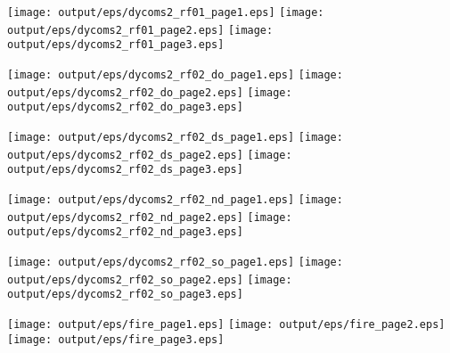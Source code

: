 \documentclass[11pt]{article}
\begin{document}
\begin{center}

\texttt{[image: output/eps/dycoms2\_rf01\_page1.eps]}
\texttt{[image: output/eps/dycoms2\_rf01\_page2.eps]}
\texttt{[image: output/eps/dycoms2\_rf01\_page3.eps]}
\end{center}
\newpage

\begin{center}

\texttt{[image: output/eps/dycoms2\_rf02\_do\_page1.eps]}
\texttt{[image: output/eps/dycoms2\_rf02\_do\_page2.eps]}
\texttt{[image: output/eps/dycoms2\_rf02\_do\_page3.eps]}
\end{center}
\newpage

\begin{center}

\texttt{[image: output/eps/dycoms2\_rf02\_ds\_page1.eps]}
\texttt{[image: output/eps/dycoms2\_rf02\_ds\_page2.eps]}
\texttt{[image: output/eps/dycoms2\_rf02\_ds\_page3.eps]}
\end{center}
\newpage

\begin{center}

\texttt{[image: output/eps/dycoms2\_rf02\_nd\_page1.eps]}
\texttt{[image: output/eps/dycoms2\_rf02\_nd\_page2.eps]}
\texttt{[image: output/eps/dycoms2\_rf02\_nd\_page3.eps]}
\end{center}
\newpage

\begin{center}

\texttt{[image: output/eps/dycoms2\_rf02\_so\_page1.eps]}
\texttt{[image: output/eps/dycoms2\_rf02\_so\_page2.eps]}
\texttt{[image: output/eps/dycoms2\_rf02\_so\_page3.eps]}
\end{center}
\newpage

\begin{center}

\texttt{[image: output/eps/fire\_page1.eps]}
\texttt{[image: output/eps/fire\_page2.eps]}
\texttt{[image: output/eps/fire\_page3.eps]}
\end{center}
\newpage
\end{document}
